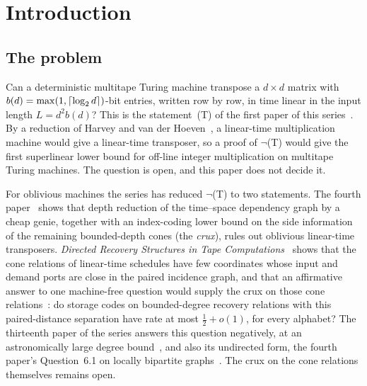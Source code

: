 \section{Introduction}\label{sec:intro}

\subsection{The problem}

Can a deterministic multitape Turing machine transpose a $d\times d$ matrix with $b(d)=\max(1,\lceil \log_2 d \rceil)$-bit entries,
written row by row, in time linear in the input length $L=d^2b(d)$? This is the statement~(T) of the first paper of this
series~\cite{FirstPaper2026}. By a reduction of Harvey and van der Hoeven~\cite[Cor.~6.9]{HvdH2025}, a linear-time
multiplication machine would give a linear-time transposer, so a proof of $\neg$(T) would give the first superlinear lower
bound for off-line integer multiplication on multitape Turing machines. The question is open, and this paper does not
decide it.

For oblivious machines the series has reduced $\neg$(T) to two statements. The fourth
paper~\cite[Theorem~4.10 and Corollary~4.11]{FourthPaper2026} shows that depth reduction of the time--space dependency
graph by a cheap genie, together with an index-coding lower bound on the side information of the remaining bounded-depth
cones (the \emph{crux}), rules out oblivious linear-time transposers. \emph{Directed Recovery Structures in Tape
Computations}~\cite{DirectedRecovery2026} shows that the cone relations of linear-time schedules have few coordinates
whose input and demand ports are close in the paired incidence graph, and that an affirmative answer to one machine-free
question would supply the crux on those cone relations~\cite[Question~9.1 and Proposition~9.2]{DirectedRecovery2026}: do
storage codes on bounded-degree recovery relations with this paired-distance separation have rate at most
$\frac12+o(1)$, for every alphabet? The thirteenth paper of the series answers this question negatively, at an
astronomically large degree bound~\cite[Theorem~A]{StorageCodes2026}, and also its undirected form, the fourth paper's
Question~6.1 on locally bipartite graphs~\cite[Corollary~U]{StorageCodes2026}. The crux on the cone relations themselves
remains open.

